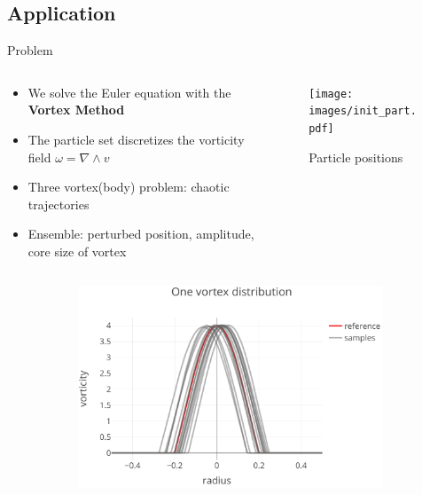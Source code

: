 \documentclass[aspectratio=169]{beamer} %
\begin{document}
\subsection{Application}
\begin{frame}{Problem}
    \vspace{-0.8cm}
    \begin{columns}
        \begin{column}{0.66\textwidth}
            \begin{itemize}[]
                \item We solve the Euler equation with the \textbf{Vortex Method}~\footnotemark[1]
                \item The particle set discretizes the vorticity field $\omega = \nabla \wedge v$
                \item Three vortex(body) problem: chaotic trajectories~\footnotemark[2]
                \item Ensemble: perturbed position, amplitude, core size of vortex
            \end{itemize}
        \end{column}
        \begin{column}{0.33\textwidth}
            \centering
            \begin{figure}
                \texttt{[image: images/init\_part.pdf]}
                \caption*{\tiny Particle positions}
            \end{figure}
        \end{column}
    \end{columns}
    \vspace{-0.5cm}
    \begin{figure}
        \begin{subfigure}[t]{0.32\textwidth}
            \centering
            \includegraphics[width=\textwidth]{images/vortex_distribution.pdf}

\end{subfigure}
\end{figure}
\end{frame}
\end{document}
